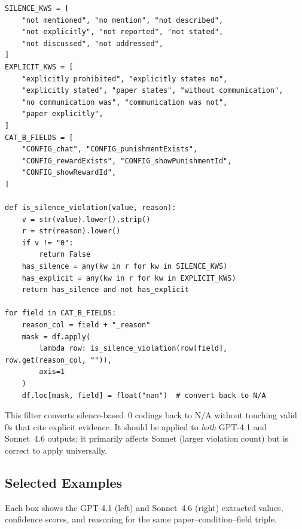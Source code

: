\documentclass[11pt,a4paper]{article}
\begin{document}
            \begin{verbatim}
SILENCE_KWS = [
    "not mentioned", "no mention", "not described",
    "not explicitly", "not reported", "not stated",
    "not discussed", "not addressed",
]
EXPLICIT_KWS = [
    "explicitly prohibited", "explicitly states no",
    "explicitly stated", "paper states", "without communication",
    "no communication was", "communication was not",
    "paper explicitly",
]
CAT_B_FIELDS = [
    "CONFIG_chat", "CONFIG_punishmentExists",
    "CONFIG_rewardExists", "CONFIG_showPunishmentId",
    "CONFIG_showRewardId",
]

def is_silence_violation(value, reason):
    v = str(value).lower().strip()
    r = str(reason).lower()
    if v != "0":
        return False
    has_silence = any(kw in r for kw in SILENCE_KWS)
    has_explicit = any(kw in r for kw in EXPLICIT_KWS)
    return has_silence and not has_explicit

for field in CAT_B_FIELDS:
    reason_col = field + "_reason"
    mask = df.apply(
        lambda row: is_silence_violation(row[field], row.get(reason_col, "")),
        axis=1
    )
    df.loc[mask, field] = float("nan")  # convert back to N/A
            \end{verbatim}

            This filter converts silence-based~0 codings back to N/A without
            touching valid 0s that cite explicit evidence.  It should be applied
            to \emph{both} GPT-4.1 and Sonnet~4.6 outputs; it primarily affects
            Sonnet (larger violation count) but is correct to apply universally.


        \subsection{Selected Examples}
        Each box shows the GPT-4.1 (left) and Sonnet~4.6 (right) extracted values,
        confidence scores, and reasoning for the same paper--condition--field triple.
\end{document}
